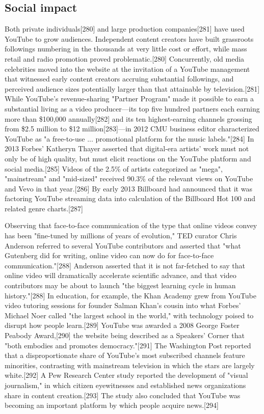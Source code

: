 \documentclass[12pt]{article}
\begin{document}
\subsection{Social impact}


Both private individuals[280] and large production companies[281] have used YouTube to grow audiences. Independent content creators have built grassroots followings numbering in the thousands at very little cost or effort, while mass retail and radio promotion proved problematic.[280] Concurrently, old media celebrities moved into the website at the invitation of a YouTube management that witnessed early content creators accruing substantial followings, and perceived audience sizes potentially larger than that attainable by television.[281] While YouTube's revenue-sharing "Partner Program" made it possible to earn a substantial living as a video producer—its top five hundred partners each earning more than \$100,000 annually[282] and its ten highest-earning channels grossing from \$2.5 million to \$12 million[283]—in 2012 CMU business editor characterized YouTube as "a free-to-use ... promotional platform for the music labels."[284] In 2013 Forbes' Katheryn Thayer asserted that digital-era artists' work must not only be of high quality, but must elicit reactions on the YouTube platform and social media.[285] Videos of the 2.5\% of artists categorized as "mega", "mainstream" and "mid-sized" received 90.3\% of the relevant views on YouTube and Vevo in that year.[286] By early 2013 Billboard had announced that it was factoring YouTube streaming data into calculation of the Billboard Hot 100 and related genre charts.[287]




Observing that face-to-face communication of the type that online videos convey has been "fine-tuned by millions of years of evolution," TED curator Chris Anderson referred to several YouTube contributors and asserted that "what Gutenberg did for writing, online video can now do for face-to-face communication."[288] Anderson asserted that it is not far-fetched to say that online video will dramatically accelerate scientific advance, and that video contributors may be about to launch "the biggest learning cycle in human history."[288] In education, for example, the Khan Academy grew from YouTube video tutoring sessions for founder Salman Khan's cousin into what Forbes' Michael Noer called "the largest school in the world," with technology poised to disrupt how people learn.[289] YouTube was awarded a 2008 George Foster Peabody Award,[290] the website being described as a Speakers' Corner that "both embodies and promotes democracy."[291] The Washington Post reported that a disproportionate share of YouTube's most subscribed channels feature minorities, contrasting with mainstream television in which the stars are largely white.[292] A Pew Research Center study reported the development of "visual journalism," in which citizen eyewitnesses and established news organizations share in content creation.[293] The study also concluded that YouTube was becoming an important platform by which people acquire news.[294]
\end{document}
